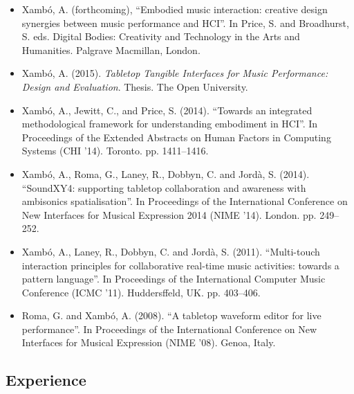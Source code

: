 \documentclass[10pt, a4paper]{article}
\begin{document}
\begin{itemize}
\item Xambó, A. (forthcoming), ``Embodied music interaction: creative design synergies between music performance and HCI''. In Price, S. and Broadhurst, S. eds. Digital Bodies: Creativity and Technology in the Arts and Humanities. Palgrave Macmillan, London.
\item Xambó, A. (2015). \emph{Tabletop Tangible Interfaces for Music Performance: Design and Evaluation}. Thesis. The Open University.
\item Xambó, A., Jewitt, C., and Price, S. (2014). “Towards an integrated methodological framework for understanding embodiment in HCI”. In Proceedings of the Extended Abstracts on Human Factors in Computing Systems (CHI ’14). Toronto. pp. 1411–1416.
\item Xambó, A., Roma, G., Laney, R., Dobbyn, C. and Jordà, S. (2014). “SoundXY4: supporting tabletop collaboration and awareness with ambisonics spatialisation”. In Proceedings of the International Conference on New Interfaces for Musical Expression 2014 (NIME ’14). London. pp. 249–252.
\item Xambó, A., Laney, R., Dobbyn, C. and Jordà, S. (2011). “Multi-touch interaction principles for collaborative real-time music activities: towards a pattern language”. In Proceedings of the International Computer Music Conference (ICMC ’11). Huddersffeld, UK. pp. 403–406.
\item Roma, G. and Xambó, A. (2008). “A tabletop waveform editor for live performance”. In Proceedings of the International Conference on New Interfaces for Musical Expression (NIME ’08). Genoa, Italy.
\end{itemize}

\subsection*{Experience}
\end{document}
